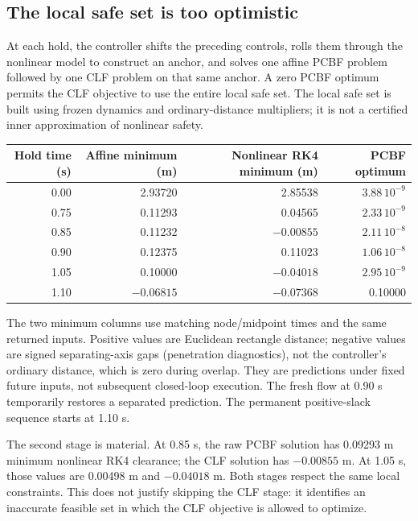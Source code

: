 \documentclass[11pt]{article}
\begin{document}
\subsection{The local safe set is too optimistic}
At each hold, the controller shifts the preceding controls, rolls them
through the nonlinear model to construct an anchor, and solves one affine
PCBF problem followed by one CLF problem on that same anchor. A zero
PCBF optimum permits the CLF objective to use the entire local safe set.
The local safe set is built using frozen dynamics and ordinary-distance
multipliers; it is not a certified inner approximation of nonlinear safety.

\begin{center}\small
\begin{tabular}{rrrr}
\toprule
Hold time (s) & Affine minimum (m) & Nonlinear RK4 minimum (m) & PCBF optimum\\
\midrule
0.00 & 2.93720 & 2.85538 & $3.88\,10^{-9}$\\
0.75 & 0.11293 & 0.04565 & $2.33\,10^{-9}$\\
0.85 & 0.11232 & $-0.00855$ & $2.11\,10^{-8}$\\
0.90 & 0.12375 & 0.11023 & $1.06\,10^{-8}$\\
1.05 & 0.10000 & $-0.04018$ & $2.95\,10^{-9}$\\
1.10 & $-0.06815$ & $-0.07368$ & 0.10000\\
\bottomrule
\end{tabular}
\end{center}
The two minimum columns use matching node/midpoint times and the same
returned inputs. Positive values are Euclidean rectangle distance; negative
values are signed separating-axis gaps (penetration diagnostics), not the
controller's ordinary distance, which is zero during overlap. They are
predictions under fixed future inputs, not subsequent closed-loop execution.
The fresh flow at 0.90 s temporarily restores a separated prediction.
The permanent positive-slack sequence starts at 1.10 s.

The second stage is material. At 0.85 s, the raw PCBF solution has 0.09293 m
minimum nonlinear RK4 clearance; the CLF solution has $-0.00855$ m. At
1.05 s, those values are 0.00498 m and $-0.04018$ m. Both stages respect
the same local constraints. This does not justify skipping the CLF stage:
it identifies an inaccurate feasible set in which the CLF objective is
allowed to optimize.
\end{document}
